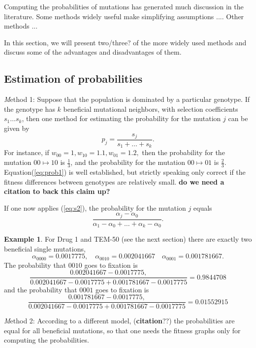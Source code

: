 \documentclass[12pt]{amsart}
\theoremstyle{plain}
\theoremstyle{definition}
\newtheorem{example}[theorem]{Example}
\begin{document}
{Computing the probabilities of mutations has generated much discussion in the literature.  Some methods widely useful make simplifying assumptions ....  Other methods ...

In this section, we will present two/three? of the more widely used methods and discuss some of the advantages and disadvantages of them.

\subsection{Estimation of probabilities}

{\emph Method 1:}
Suppose that the population is dominated by a particular genotype.
If the genotype has $k$ beneficial mutational neighbors,
with selection coefficients $s_1 \dots s_k$,
then one method for estimating the probability for the mutation $j$ can be given by
\begin{equation}
p_j = \frac{s_j}{s_1+ \dots + s_k}. \label{eq:prob1}
\end{equation}
For instance, if $ w_{00}=1, w_{10}=1.1, w_{01}=1.2,$
then the probability for
the mutation $00 \mapsto 10$
is $\frac{1}{3}$,
and the probability for
the mutation $00 \mapsto 01$
is $\frac{2}{3}$.
Equation(\ref{eq:prob1}) is well established, but strictly speaking only correct if the fitness differences between
genotypes are relatively small. {\bf do we need a citation to back this claim up?}

If one now applies (\ref{eq:s2}), the probability for the mutation $j$ 
equals
\[
\frac{\alpha_j-\alpha_0}
{\alpha_1-\alpha_0+ \dots + \alpha_k-\alpha_0}.
\]


\begin{example}
For Drug 1 and TEM-50 (see the next section)
there are exactly two beneficial single mutations,
\[
\alpha_{0000}=0.0017775, \quad
\alpha_{0010}=  0.002041667 \quad
\alpha_{0001}= 0.001781667.
\]
The probability that 
$0010$ goes to fixation is
\[
\frac{0.002041667- 0.0017775,}
{ 0.002041667-0.0017775 +  0.001781667-0.0017775}=
0.9844708
\]
and the probability that $0001$ goes to fixation is
\[
\frac{0.001781667-0.0017775,}
{ 0.002041667-0.0017775 +  0.001781667-0.0017775}=
0.01552915
\]
\end{example}



{\emph Method 2:}
According to a different model, ({\bf citation}??) the probabilities are equal for all beneficial mutations, so that
one needs the fitness graphs only for computing the probabilities.




}
\end{document}
